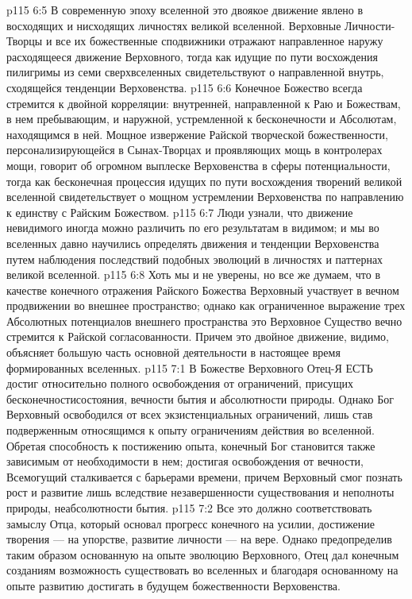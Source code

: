 \vs p115 6:5 В современную эпоху вселенной это двоякое движение явлено в восходящих и нисходящих личностях великой вселенной. Верховные Личности\hyp{}Творцы и все их божественные сподвижники отражают направленное наружу расходящееся движение Верховного, тогда как идущие по пути восхождения пилигримы из семи сверхвселенных свидетельствуют о направленной внутрь, сходящейся тенденции Верховенства.
\vs p115 6:6 Конечное Божество всегда стремится к двойной корреляции: внутренней, направленной к Раю и Божествам, в нем пребывающим, и наружной, устремленной к бесконечности и Абсолютам, находящимся в ней. Мощное извержение Райской творческой божественности, персонализирующейся в Сынах\hyp{}Творцах и проявляющих мощь в контролерах мощи, говорит об огромном выплеске Верховенства в сферы потенциальности, тогда как бесконечная процессия идущих по пути восхождения творений великой вселенной свидетельствует о мощном устремлении Верховенства по направлению к единству с Райским Божеством.
\vs p115 6:7 Люди узнали, что движение невидимого иногда можно различить по его результатам в видимом; и мы во вселенных давно научились определять движения и тенденции Верховенства путем наблюдения последствий подобных эволюций в личностях и паттернах великой вселенной.
\vs p115 6:8 Хоть мы и не уверены, но все же думаем, что в качестве конечного отражения Райского Божества Верховный участвует в вечном продвижении во внешнее пространство; однако как ограниченное выражение трех Абсолютных потенциалов внешнего пространства это Верховное Существо вечно стремится к Райской согласованности. Причем это двойное движение, видимо, объясняет большую часть основной деятельности в настоящее время формированных вселенных.
\vs p115 7:1 В Божестве Верховного Отец\hyp{}Я ЕСТЬ достиг относительно полного освобождения от ограничений, присущих бесконечностисостояния, вечности бытия и абсолютности природы. Однако Бог Верховный освободился от всех экзистенциальных ограничений, лишь став подверженным относящимся к опыту ограничениям действия во вселенной. Обретая способность к постижению опыта, конечный Бог становится также зависимым от необходимости в нем; достигая освобождения от вечности, Всемогущий сталкивается с барьерами времени, причем Верховный смог познать рост и развитие лишь вследствие незавершенности существования и неполноты природы, неабсолютности бытия.
\vs p115 7:2 Все это должно соответствовать замыслу Отца, который основал прогресс конечного на усилии, достижение творения --- на упорстве, развитие личности --- на вере. Однако предопределив таким образом основанную на опыте эволюцию Верховного, Отец дал конечным созданиям возможность существовать во вселенных и благодаря основанному на опыте развитию достигать в будущем божественности Верховенства.
